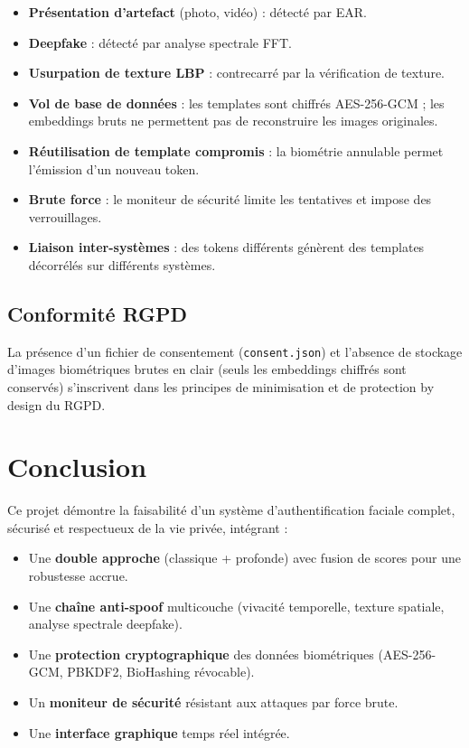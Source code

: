\documentclass[12pt,a4paper]{article}
\begin{document}
\begin{itemize}
  \item \textbf{Présentation d'artefact} (photo, vidéo) : détecté par EAR.
  \item \textbf{Deepfake} : détecté par analyse spectrale FFT.
  \item \textbf{Usurpation de texture LBP} : contrecarré par la vérification
        de texture.
  \item \textbf{Vol de base de données} : les templates sont chiffrés
        AES-256-GCM ; les embeddings bruts ne permettent pas de reconstruire
        les images originales.
  \item \textbf{Réutilisation de template compromis} : la biométrie annulable
        permet l'émission d'un nouveau token.
  \item \textbf{Brute force} : le moniteur de sécurité limite les tentatives
        et impose des verrouillages.
  \item \textbf{Liaison inter-systèmes} : des tokens différents génèrent des
        templates décorrélés sur différents systèmes.
\end{itemize}

\subsection{Conformité RGPD}

La présence d'un fichier de consentement (\texttt{consent.json}) et l'absence
de stockage d'images biométriques brutes en clair (seuls les embeddings
chiffrés sont conservés) s'inscrivent dans les principes de minimisation et de
protection by design du RGPD.

\section{Conclusion}

Ce projet démontre la faisabilité d'un système d'authentification faciale
complet, sécurisé et respectueux de la vie privée, intégrant :

\begin{itemize}
  \item Une \textbf{double approche} (classique + profonde) avec fusion de
        scores pour une robustesse accrue.
  \item Une \textbf{chaîne anti-spoof} multicouche (vivacité temporelle, texture
        spatiale, analyse spectrale deepfake).
  \item Une \textbf{protection cryptographique} des données biométriques
        (AES-256-GCM, PBKDF2, BioHashing révocable).
  \item Un \textbf{moniteur de sécurité} résistant aux attaques par force brute.
  \item Une \textbf{interface graphique} temps réel intégrée.
\end{itemize}
\end{document}

